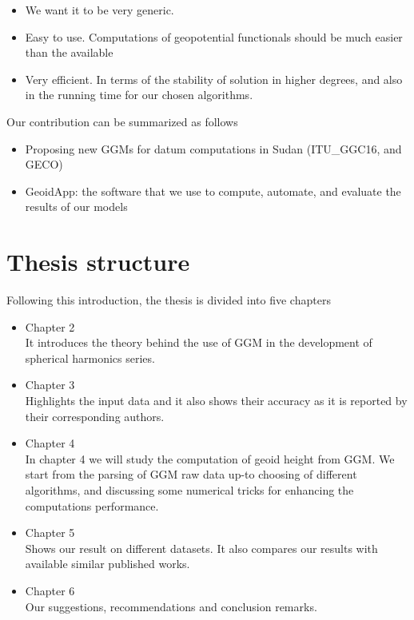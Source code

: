 \begin{itemize}
	\item We want it to be very generic.
	\item Easy to use. Computations of geopotential functionals should be much easier than the available
	\item Very efficient. In terms of the stability of solution in higher degrees, and also in the running time for our chosen algorithms.
\end{itemize}

Our contribution can be summarized as follows 
\begin{itemize}
	\item Proposing new GGMs for datum computations in Sudan (ITU\_GGC16, and GECO)
	\item GeoidApp: the software that we use to compute, automate, and evaluate the results of our models
\end{itemize}


\section{Thesis structure}
Following this introduction, the thesis is divided into five chapters

\begin{itemize}
	\item Chapter 2\\
	It introduces the theory behind the use of GGM in the development of spherical harmonics series.
	\item Chapter 3\\
	Highlights the input data and it also shows their accuracy as it is reported by their corresponding authors.
	\item Chapter 4\\
	In chapter 4 we will study the computation of geoid height from GGM. We start from the parsing of GGM raw data up-to choosing of different algorithms, and discussing some numerical tricks for enhancing the computations performance.
	\item Chapter 5\\
	Shows our result on different datasets. It also compares our results with available similar published works.
	\item Chapter 6\\
	Our suggestions, recommendations and conclusion remarks.
\end{itemize}

